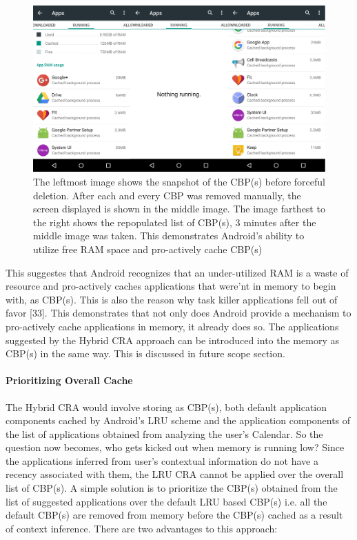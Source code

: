 \documentclass[12pt]{uthesis-v12}  %
\begin{document}
					\begin{figure}[!ht]
						\centering
						\includegraphics[width = 130mm]{images/stage123.png}
						\caption[CBP(s) before and after manual removal]
						{The leftmost image shows the snapshot of the CBP(s) before forceful deletion. After each and every CBP was removed manually, the screen displayed is shown in the middle image. The image farthest to the right shows the repopulated list of CBP(s), 3 minutes after the middle image was taken. This demonstrates Android's ability to utilize free RAM space and pro-actively cache CBP(s)}
					\end{figure}					
					
					This suggestes that Android recognizes that an under-utilized RAM is a waste of resource and pro-actively caches applications that were'nt in memory to begin with, as CBP(s). This is also the reason why task killer applications fell out of favor [33]. This demonstrates that not only does Android provide a mechanism to pro-actively cache applications in memory, it already does so. The applications suggested by the Hybrid CRA approach can be introduced into the memory as CBP(s) in the same way. This is discussed in future scope section. 

				\paragraph{Prioritizing Overall Cache}	
					The Hybrid CRA would involve storing as CBP(s), both default application components cached by Android's LRU scheme and the application components of the list of applications obtained from analyzing the user's Calendar. So the question now becomes, who gets kicked out when memory is running low? Since the applications inferred from user's contextual information do not have a recency associated with them, the LRU CRA cannot be applied over the overall list of CBP(s). A simple solution is to prioritize the CBP(s) obtained from the list of suggested applications over the default LRU based CBP(s) i.e. all the default CBP(s) are removed from memory before the CBP(s) cached as a result of context inference. There are two advantages to this approach:
					
\end{document}
